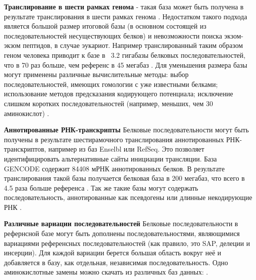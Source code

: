 \textbf{Транслирование в шести рамках генома} - такая база может быть получена в результате транслирования в шести рамках генома \cite{baerenfaller2008genome}. Недостатком такого подхода является большой размер итоговой базы (в основном состоящей из последовательностей несуществующих белков) и невозможности поиска экзом-экзом пептидов, в случае эукариот. Например транслированный таким образом геном человека приводит к базе в ~3.2 гигабазы белковых последовательностей, что в 70 раз больше, чем референс в 45 мегабаз \cite{khatun2013whole}. Для уменьшения размера базы могут применены различные вычислительные методы: выбор последовательностей, имеющих гомологии с уже известными белками; использование методов предсказания кодирующего потенциала; исключение слишком коротких последовательностей (например, меньших, чем 30 аминокислот) \cite{blakeley2012addressing}. 



\textbf{Аннотированные РНК-транскрипты} Белковые последовательности могут быть получены в результате шестирамочного транслирования аннотированных РНК-транскриптов, например из баз Enselbl или RefSeq. Это позволяет идентифицировать альтернативные сайты инициации трансляции. База GENCODE содержит 84408 мРНК аннотированных белков. В результате транслирования такой базы получается белковая база в 200 мегабаз, что всего в 4.5 раза больше референса \cite{khatun2013whole}. Так же такие базы могут содержать последовательность, аннотированные как псевдогены или длинные некодирующие РНК \cite{derrien2012gencode}.


\textbf{Различные вариации последовательностей} Белковые последовательности в рефернсной базе могут быть дополнены последовательностями, являющимися вариациями референсных последовательностей (как правило, это SAP, делеции и инсерции). Для каждой вариации берется большая область вокруг неё и добавляется в базу, как отдельная, независимая последовательность. Одно аминокислотные замены можно скачать из различных баз данных:  \cite{li2011bioinformatics}.  



